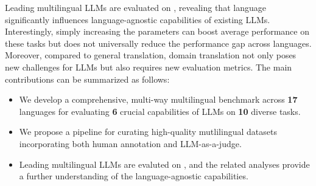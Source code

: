 

Leading multilingual LLMs are evaluated on \name, revealing that language significantly influences language-agnostic capabilities of existing LLMs. 
Interestingly, simply increasing the parameters can boost average performance on these tasks but does not universally reduce the performance gap across languages. 
Moreover, compared to general translation, domain translation not only poses new challenges for LLMs but also requires new evaluation metrics. 
The main contributions can be summarized as follows:
\begin{itemize} [nosep,itemsep=1pt,leftmargin=0.3cm]
    \item We develop a comprehensive, multi-way multilingual benchmark across \textbf{17} languages for evaluating \textbf{6} crucial capabilities of LLMs on \textbf{10} diverse tasks.
    \item We propose a pipeline for curating high-quality mutlilingual datasets incorporating both human annotation and LLM-as-a-judge.
    \item Leading multilingual LLMs are evaluted on \name, and the related analyses provide a further understanding of the language-agnostic capabilities.
\end{itemize}